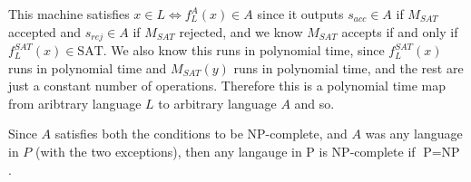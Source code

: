 \documentclass[english]{article}
\begin{document}
This machine satisfies $x \in L \iff f^A_L(x) \in A$ since it outputs 
$s_{acc} \in A$ if $M_{SAT}$ accepted and $s_{rej} \in A$ if $M_{SAT}$
rejected, and we know $M_{SAT}$ accepts if and only if
$f^{SAT}_L(x) \in \textrm{SAT}$. We also know this runs in polynomial time,
since $f^{SAT}_L(x)$ runs in polynomial time and $M_{SAT}(y)$ runs in 
polynomial time, and the rest are just a constant number of operations.
Therefore this is a polynomial time map from aribtrary language $L$ to 
arbitrary language $A$ and so.

Since $A$ satisfies both the conditions to be NP-complete, and $A$ was 
any language in $P$ (with the two exceptions), then any langauge in P is
NP-complete if $\textrm{P} = \textrm{NP}$.
\end{document}
